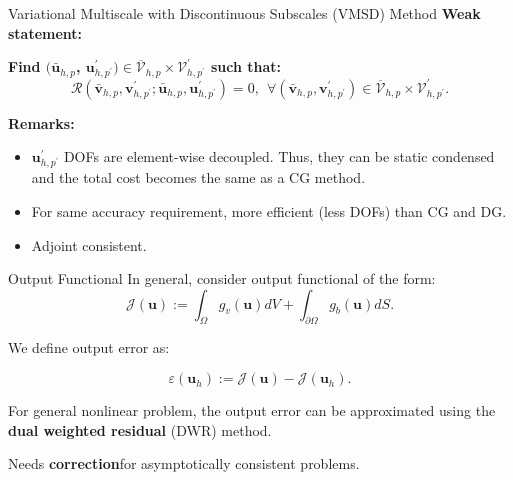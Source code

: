 \documentclass{beamer}
\newcounter{sectionframecount}
\begin{document}
\begin{frame}[t]{Variational Multiscale with Discontinuous Subscales (VMSD) Method}
  \textbf{Weak statement:}

  \vspace{10pt}
  \textbf{Find $(\bar{\boldsymbol{u}}_{h,p}$, $\boldsymbol{u}^\prime_{h,p^\prime}) \in \overline{\mathcal{V}}_{h,p} \times \mathcal{V}^\prime_{h,p^\prime}$ such that:}
  \begin{equation}
    \mathcal{R}(\bar{\boldsymbol{v}}_{h,p},\boldsymbol{v}^\prime_{h,p^\prime};\bar{\boldsymbol{u}}_{h,p},\boldsymbol{u}^\prime_{h,p^\prime}) = 0,~~\forall (\bar{\boldsymbol{v}}_{h,p},\boldsymbol{v}^\prime_{h,p^\prime}) \in \overline{\mathcal{V}}_{h,p} \times \mathcal{V}^\prime_{h,p^\prime}.
    \label{e:multiscale_weak_statement}
  \end{equation}

  \vspace{10pt}
  \textbf{Remarks:}
  \begin{itemize}
    \item $\boldsymbol{u}^\prime_{h,p^\prime}$ DOFs are element-wise decoupled. Thus, they can be static condensed and the total cost becomes the same as a CG method.
    \item For same accuracy requirement, more efficient (less DOFs) than CG and DG.
    \item Adjoint consistent.
  \end{itemize}
\end{frame}


\begin{frame}[t]{Output Functional}
  In general, consider output functional of the form:
  \begin{equation}
    \mathcal{J}(\boldsymbol{u}) := \int_{\Omega} g_v(\boldsymbol{u})dV + \int_{\partial \Omega} g_b(\boldsymbol{u})dS.
    \label{e:general_output_functional}
  \end{equation}

We define output error as:

\begin{equation}
  \varepsilon (\boldsymbol{u}_h) := \mathcal{J}(\boldsymbol{u}) - \mathcal{J}(\boldsymbol{u}_h).
\end{equation}

\vspace{8pt}
For general nonlinear problem, the output error can be approximated using the \textbf{dual weighted residual} (DWR) method.

\vspace{10pt}
Needs \textbf{correction}\footnotemark for asymptotically consistent problems.


\end{frame}
\end{document}

